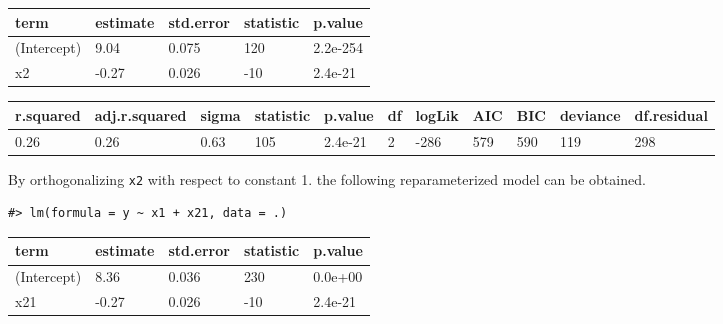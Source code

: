 \begin{table}[H]
\centering
\begin{tabular}{lllll}
\toprule
term & estimate & std.error & statistic & p.value\\
\midrule
(Intercept) & 9.04 & 0.075 & 120 & 2.2e-254\\
x2 & -0.27 & 0.026 & -10 & 2.4e-21\\
\bottomrule
\end{tabular}
\end{table}

\begin{table}[H]
\centering
\begin{tabular}{lllllllllll}
\toprule
r.squared & adj.r.squared & sigma & statistic & p.value & df & logLik & AIC & BIC & deviance & df.residual\\
\midrule
0.26 & 0.26 & 0.63 & 105 & 2.4e-21 & 2 & -286 & 579 & 590 & 119 & 298\\
\bottomrule
\end{tabular}
\end{table}

By orthogonalizing \texttt{x2} with respect to constant 1. the following
reparameterized model can be obtained.

\begin{Shaded}
\end{Shaded}

\begin{verbatim}
#> lm(formula = y ~ x1 + x21, data = .)
\end{verbatim}

\begin{table}[H]
\centering
\begin{tabular}{lllll}
\toprule
term & estimate & std.error & statistic & p.value\\
\midrule
(Intercept) & 8.36 & 0.036 & 230 & 0.0e+00\\
x21 & -0.27 & 0.026 & -10 & 2.4e-21\\
\bottomrule
\end{tabular}
\end{table}

